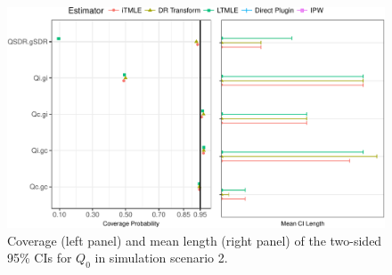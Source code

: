 \documentclass{article}\usepackage[]{graphicx}\usepackage[]{color}
\newenvironment{knitrout}{}{} %
\begin{document}
\begin{knitrout}
\color{fgcolor}\begin{figure}[H]

{\centering \includegraphics[width=.9\linewidth]{figure/plot-ggplot_CIcov_CIlen_t5-1} 

}

\caption[Coverage (left panel) and mean length (right panel) of the two-sided 95\% CIs for $Q_0$ in simulation scenario 2]{Coverage (left panel) and mean length (right panel) of the two-sided 95\% CIs for $Q_0$ in simulation scenario 2.}\label{fig:ggplot.CIcov.CIlen.t5}
\end{figure}


\end{knitrout}



\clearpage
\end{document}
